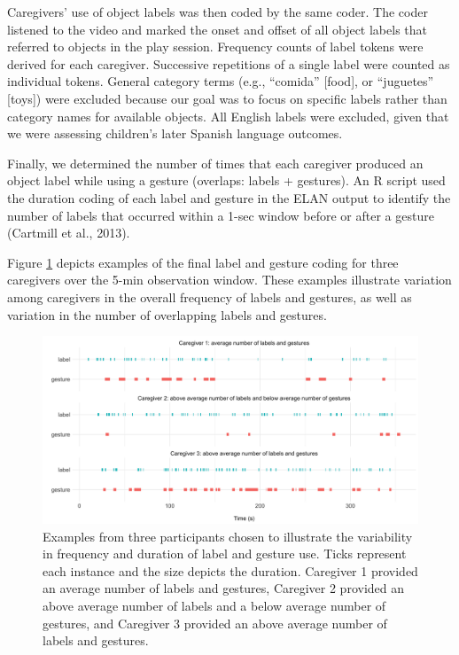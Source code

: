 \documentclass[
  man,mask,floatsintext]{apa6}
\begin{document}
Caregivers' use of object labels was then coded by the same coder. The coder listened to the video and marked the onset and offset of all object labels that referred to objects in the play session. Frequency counts of label tokens were derived for each caregiver. Successive repetitions of a single label were counted as individual tokens. General category terms (e.g., ``comida'' {[}food{]}, or ``juguetes'' {[}toys{]}) were excluded because our goal was to focus on specific labels rather than category names for available objects. All English labels were excluded, given that we were assessing children's later Spanish language outcomes.

Finally, we determined the number of times that each caregiver produced an object label while using a gesture (overlaps: labels + gestures). An R script used the duration coding of each label and gesture in the ELAN output to identify the number of labels that occurred within a 1-sec window before or after a gesture (Cartmill et al., 2013).

Figure \ref{fig:fig1} depicts examples of the final label and gesture coding for three caregivers over the 5-min observation window. These examples illustrate variation among caregivers in the overall frequency of labels and gestures, as well as variation in the number of overlapping labels and gestures.

\begin{figure}
\includegraphics[width=1\linewidth]{../stats/figures/fig.durations} \caption{Examples from three participants chosen to illustrate the variability in frequency and duration of label and gesture use.  Ticks represent each instance and the size depicts the duration.  Caregiver 1 provided an average number of labels and gestures, Caregiver 2 provided an above average number of labels and a below average number of gestures, and Caregiver 3 provided an above average number of labels and gestures.}\label{fig:fig1}
\end{figure}
\end{document}
